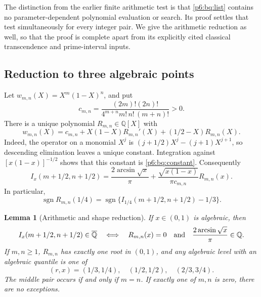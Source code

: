 \documentclass[11pt,a4paper]{article}
\newtheorem{lemma}[theorem]{Lemma}
\theoremstyle{definition}
\theoremstyle{remark}
\numberwithin{equation}{section}
\begin{document}
The distinction from the earlier finite arithmetic test is that
\eqref{p6:bq:list} contains no parameter-dependent polynomial evaluation or
search. Its proof settles that test simultaneously for every integer pair.
We give the arithmetic reduction as well, so that the proof is complete
apart from its explicitly cited classical transcendence and prime-interval
inputs.

\subsection{Reduction to three algebraic points}

Let $w_{m,n}(X)=X^m(1-X)^n$, and put
\begin{equation}\label{p6:bq:constant}
 c_{m,n}=\frac{(2m)!(2n)!}{4^{m+n}m!\,n!\,(m+n)!}>0.
\end{equation}
There is a unique polynomial $R_{m,n}\in\mathbb Q[X]$ with
\begin{equation}\label{p6:bq:operator}
 w_{m,n}(X)=c_{m,n}+X(1-X)R_{m,n}'(X)
                              +(1/2-X)R_{m,n}(X).
\end{equation}
Indeed, the operator on a monomial $X^j$ is
$(j+1/2)X^j-(j+1)X^{j+1}$, so descending elimination leaves
a unique constant. Integration against $[x(1-x)]^{-1/2}$ shows
that this constant is \eqref{p6:bq:constant}. Consequently
\begin{equation}\label{p6:bq:primitive}
 I_x(m+1/2,n+1/2)
 =\frac{2\arcsin\sqrt{x}}\pi
   +\frac{\sqrt{x(1-x)}}{\pi c_{m,n}}R_{m,n}(x).
\end{equation}
In particular,
\begin{equation}\label{p6:bq:quarter-sign}
 \operatorname{sgn}R_{m,n}(1/4)
  =\operatorname{sgn}\{I_{1/4}(m+1/2,n+1/2)-1/3\}.
\end{equation}

\begin{lemma}[Arithmetic and shape reduction]\label{p6:bq:reduction}
If $x\in(0,1)$ is algebraic, then
\begin{equation}\label{p6:bq:arithmetic}
 I_x(m+1/2,n+1/2)\in\overline{\mathbb Q}
 \quad\Longleftrightarrow\quad
 R_{m,n}(x)=0\quad\hbox{and}\quad
 \frac{2\arcsin\sqrt{x}}\pi\in\mathbb Q.
\end{equation}
If $m,n\ge1$, $R_{m,n}$ has exactly one root in $(0,1)$, and
any algebraic level with an algebraic quantile is one of
\[
 (r,x)=(1/3,1/4),\quad(1/2,1/2),\quad(2/3,3/4).
\]
The middle pair occurs if and only if $m=n$.
If exactly one of $m,n$ is zero, there are no exceptions.
\end{lemma}
\end{document}
